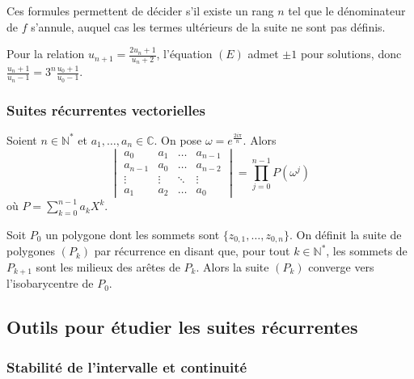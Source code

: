   \begin{remark}
    Ces formules permettent de décider s'il existe un rang $n$ tel que le dénominateur de $f$ s'annule, auquel cas les termes ultérieurs de la suite ne sont pas définis.
  \end{remark}

  \begin{example}
    Pour la relation $u_{n+1} = \frac{2u_n + 1}{u_n + 2}$, l'équation $(E)$ admet $\pm 1$ pour solutions, donc $\frac{u_n + 1}{u_n - 1} = 3^n \frac{u_0 + 1}{u_0 - 1}$.
  \end{example}

  \subsubsection{Suites récurrentes vectorielles}


  \begin{proposition}
    Soient $n \in \mathbb{N}^*$ et $a_1, \dots, a_n \in \mathbb{C}$. On pose $\omega = e^{\frac{2i\pi}{n}}$. Alors
    \[ \begin{vmatrix} a_0 & a_1 & \dots & a_{n-1} \\ a_{n-1} & a_0 & \dots & a_{n-2}\\ \vdots & \vdots & \ddots & \vdots \\ a_1 & a_2 & \dots & a_0 \end{vmatrix} = \prod_{j=0}^{n-1} P(\omega^j) \]
    où $P = \sum_{k=0}^{n-1} a_k X^k$.
  \end{proposition}


  \begin{application}
    Soit $P_0$ un polygone dont les sommets sont $\{ z_{0,1}, \dots, z_{0,n} \}$. On définit la suite de polygones $(P_k)$ par récurrence en disant que, pour tout $k \in \mathbb{N}^*$, les sommets de $P_{k+1}$ sont les milieux des arêtes de $P_k$.
    \newpar
    Alors la suite $(P_k)$ converge vers l'isobarycentre de $P_0$.
  \end{application}

  \subsection{Outils pour étudier les suites récurrentes}

  \subsubsection{Stabilité de l'intervalle et continuité}

